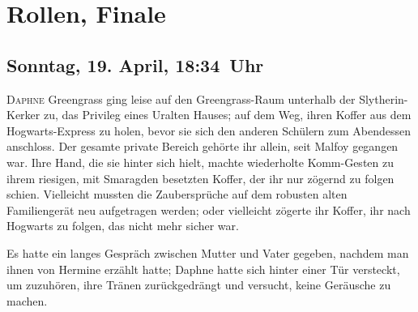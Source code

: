 \chapter{Rollen, Finale}

\section{Sonntag, 19. April, 18:34~Uhr}

\lettrine{D}{aphne} Greengrass ging leise auf den Greengrass-Raum unterhalb der Slytherin-Kerker zu, das Privileg eines Uralten Hauses; auf dem Weg, ihren Koffer aus dem Hogwarts-Express zu holen, bevor sie sich den anderen Schülern zum Abendessen anschloss. Der gesamte private Bereich gehörte ihr allein, seit Malfoy gegangen war. Ihre Hand, die sie hinter sich hielt, machte wiederholte Komm-Gesten zu ihrem riesigen, mit Smaragden besetzten Koffer, der ihr nur zögernd zu folgen schien. Vielleicht mussten die Zaubersprüche auf dem robusten alten Familiengerät neu aufgetragen werden; oder vielleicht zögerte ihr Koffer, ihr nach Hogwarts zu folgen, das nicht mehr sicher war.

Es hatte ein langes Gespräch zwischen Mutter und Vater gegeben, nachdem man ihnen von Hermine erzählt hatte; Daphne hatte sich hinter einer Tür versteckt, um zuzuhören, ihre Tränen zurückgedrängt und versucht, keine Geräusche zu machen.

